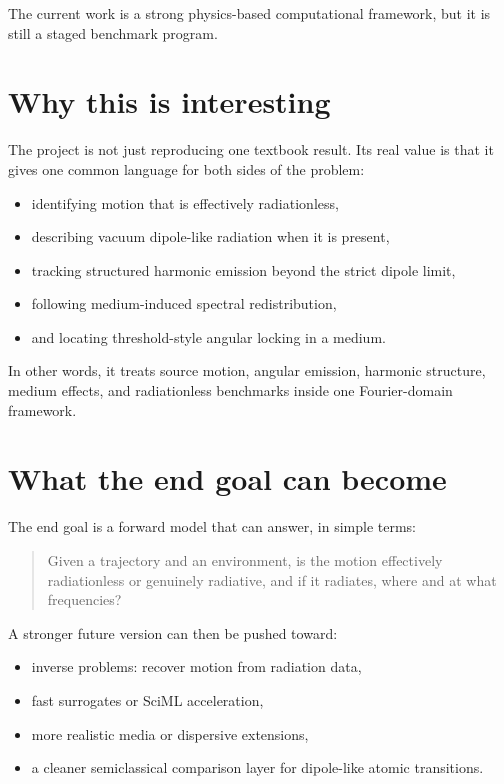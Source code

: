 \documentclass[11pt]{article}
\begin{document}
The current work is a strong physics-based computational framework, but it is still a staged benchmark program.

\section{Why this is interesting}

The project is not just reproducing one textbook result. Its real value is that it gives one common language for both sides of the problem:

\begin{itemize}
    \item identifying motion that is effectively radiationless,
    \item describing vacuum dipole-like radiation when it is present,
    \item tracking structured harmonic emission beyond the strict dipole limit,
    \item following medium-induced spectral redistribution,
    \item and locating threshold-style angular locking in a medium.
\end{itemize}

In other words, it treats source motion, angular emission, harmonic structure, medium effects, and radiationless benchmarks inside one Fourier-domain framework.

\section{What the end goal can become}

The end goal is a forward model that can answer, in simple terms:

\begin{quote}
Given a trajectory and an environment, is the motion effectively radiationless or genuinely radiative, and if it radiates, where and at what frequencies?
\end{quote}

A stronger future version can then be pushed toward:
\begin{itemize}
    \item inverse problems: recover motion from radiation data,
    \item fast surrogates or SciML acceleration,
    \item more realistic media or dispersive extensions,
    \item a cleaner semiclassical comparison layer for dipole-like atomic transitions.
\end{itemize}
\end{document}

